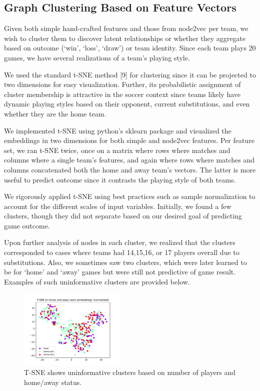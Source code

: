 \subsection{Graph Clustering Based on Feature Vectors}
Given both simple hand-crafted features and those from node2vec per team, we wish to cluster them to discover latent relationships or whether they aggregate based on outcome (`win', `loss', `draw') or team identity. Since each team plays 20 games, we have several realizations of a team's playing style.

We used the standard t-SNE method [9] for clustering since it can be projected to two dimensions for easy visualization. Further, its probabilistic assignment of cluster membership is attractive in the soccer context since teams likely have dynamic playing styles based on their opponent, current substitutions, and even whether they are the home team.

We implemented t-SNE using python's  sklearn package and visualized the embeddings in two dimensions for both simple and node2vec features. Per feature set, we ran t-SNE twice, once on a matrix where rows where matches and columns where a single team's features, and again where rows where matches and columns concatenated both the home and away team's vectors. The latter is more useful to predict outcome since it contrasts the playing style of both teams.

We rigorously applied t-SNE using best practices such as sample normalization to account for the different scales of input variables. Initially, we found a few clusters, though they did not separate based on our desired goal of predicting game outcome.


Upon further analysis of nodes in each cluster, we realized that the clusters corresponded to cases where teams had 14,15,16, or 17 players overall due to substitutions. Also, we sometimes saw two clusters, which were later learned to be for `home' and `away' games but were still not predictive of game result. Examples of such uninformative clusters are provided below. 

\begin{figure}[h]
  \centering
  \includegraphics[width=0.45\textwidth]{plots/game_NORM_tsne.pdf}
  \caption{T-SNE shows uninformative clusters based on number of players and home/away status.}
    \label{fig:tsne_game}
\end{figure}


